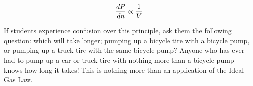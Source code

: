 $${dP \over dn} \propto {1 \over V}$$

If students experience confusion over this principle, ask them the following question: which will take longer; pumping up a bicycle tire with a bicycle pump, or pumping up a truck tire with the same bicycle pump?  Anyone who has ever had to pump up a car or truck tire with nothing more than a bicycle pump knows how long it takes!  This is nothing more than an application of the Ideal Gas Law.




